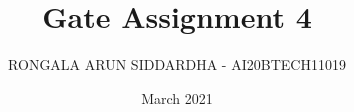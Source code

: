 \documentclass[journal,12pt,twocolumn]{IEEEtran}
\date{March 2021}
\theoremstyle{plain}
\theoremstyle{definition}
\theoremstyle{remark}
\DeclareMathOperator*{\Res}{Res}
\begin{document}
\newcommand{\multlinecomment}[1]{\directlua{-- #1}}
\newcommand{\BEQA}{\begin{eqnarray}}
\newcommand{\EEQA}{\end{eqnarray}}
\newcommand{\define}{\stackrel{\triangle}{=}}

\raggedbottom
\setlength{\parindent}{0pt}
\providecommand{\mbf}{\mathbf}
\providecommand{\pr}[1]{\ensuremath{\Pr\left(#1\right)}}
\providecommand{\qfunc}[1]{\ensuremath{Q\left(#1\right)}}
\providecommand{\fn}[1]{\ensuremath{f\left(#1\right)}}
\providecommand{\e}[1]{\ensuremath{E\left(#1\right)}}
\providecommand{\sbrak}[1]{\ensuremath{{}\left[#1\right]}}
\providecommand{\lsbrak}[1]{\ensuremath{{}\left[#1\right.}}
\providecommand{\rsbrak}[1]{\ensuremath{{}\left.#1\right]}}
\providecommand{\brak}[1]{\ensuremath{\left(#1\right)}}
\providecommand{\lbrak}[1]{\ensuremath{\left(#1\right.}}
\providecommand{\rbrak}[1]{\ensuremath{\left.#1\right)}}
\providecommand{\cbrak}[1]{\ensuremath{\left\{#1\right\}}}
\providecommand{\lcbrak}[1]{\ensuremath{\left\{#1\right.}}
\providecommand{\rcbrak}[1]{\ensuremath{\left.#1\right\}}}

\newcommand{\sgn}{\mathop{\mathrm{sgn}}}
\providecommand{\abs}[1]{\vert#1\vert}
\providecommand{\res}[1]{\Res\displaylimits_{#1}} 
\providecommand{\norm}[1]{\lVert#1\rVert}
\providecommand{\mtx}[1]{\mathbf{#1}}
\providecommand{\mean}[1]{E[ #1 ]}
\providecommand{\fourier}{\overset{\mathcal{F}}{ \rightleftharpoons}}
\providecommand{\system}{\overset{\mathcal{H}}{ \longleftrightarrow}}
\newcommand{\solution}{\noindent \textbf{Solution: }}
\newcommand{\cosec}{\,\text{cosec}\,}
\providecommand{\dec}[2]{\ensuremath{\overset{#1}{\underset{#2}{\gtrless}}}}
\newcommand{\myvec}[1]{\ensuremath{\begin{pmatrix}#1\end{pmatrix}}}
\newcommand{\mydet}[1]{\ensuremath{\begin{vmatrix}#1\end{vmatrix}}}
\makeatletter
\vspace{3cm}
\title{Gate Assignment 4}
\author{RONGALA ARUN SIDDARDHA - AI20BTECH11019}
\maketitle
\newpage
\bigskip
\renewcommand{\thetable}{\theenumi}
\end{document}
